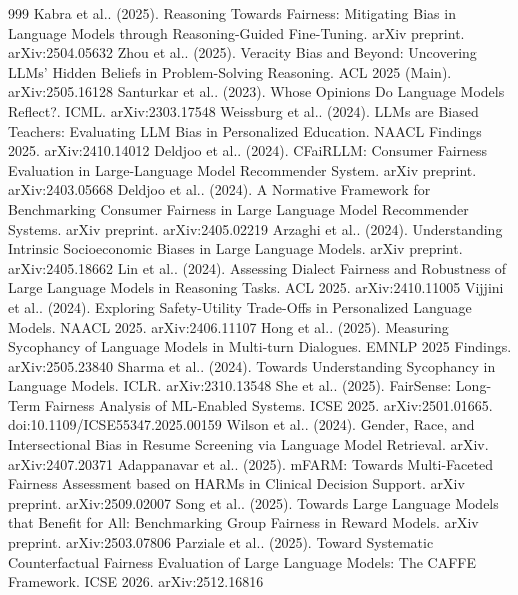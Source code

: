 \documentclass[10pt]{article}
\begin{document}
\begin{thebibliography}{999}
 Kabra et al.. (2025). Reasoning Towards Fairness: Mitigating Bias in Language Models through Reasoning-Guided Fine-Tuning. arXiv preprint. arXiv:2504.05632
 Zhou et al.. (2025). Veracity Bias and Beyond: Uncovering LLMs' Hidden Beliefs in Problem-Solving Reasoning. ACL 2025 (Main). arXiv:2505.16128
 Santurkar et al.. (2023). Whose Opinions Do Language Models Reflect?. ICML. arXiv:2303.17548
 Weissburg et al.. (2024). LLMs are Biased Teachers: Evaluating LLM Bias in Personalized Education. NAACL Findings 2025. arXiv:2410.14012
 Deldjoo et al.. (2024). CFaiRLLM: Consumer Fairness Evaluation in Large-Language Model Recommender System. arXiv preprint. arXiv:2403.05668
 Deldjoo et al.. (2024). A Normative Framework for Benchmarking Consumer Fairness in Large Language Model Recommender Systems. arXiv preprint. arXiv:2405.02219
 Arzaghi et al.. (2024). Understanding Intrinsic Socioeconomic Biases in Large Language Models. arXiv preprint. arXiv:2405.18662
 Lin et al.. (2024). Assessing Dialect Fairness and Robustness of Large Language Models in Reasoning Tasks. ACL 2025. arXiv:2410.11005
 Vijjini et al.. (2024). Exploring Safety-Utility Trade-Offs in Personalized Language Models. NAACL 2025. arXiv:2406.11107
 Hong et al.. (2025). Measuring Sycophancy of Language Models in Multi-turn Dialogues. EMNLP 2025 Findings. arXiv:2505.23840
 Sharma et al.. (2024). Towards Understanding Sycophancy in Language Models. ICLR. arXiv:2310.13548
 She et al.. (2025). FairSense: Long-Term Fairness Analysis of ML-Enabled Systems. ICSE 2025. arXiv:2501.01665. doi:10.1109/ICSE55347.2025.00159
 Wilson et al.. (2024). Gender, Race, and Intersectional Bias in Resume Screening via Language Model Retrieval. arXiv. arXiv:2407.20371
 Adappanavar et al.. (2025). mFARM: Towards Multi-Faceted Fairness Assessment based on HARMs in Clinical Decision Support. arXiv preprint. arXiv:2509.02007
 Song et al.. (2025). Towards Large Language Models that Benefit for All: Benchmarking Group Fairness in Reward Models. arXiv preprint. arXiv:2503.07806
 Parziale et al.. (2025). Toward Systematic Counterfactual Fairness Evaluation of Large Language Models: The CAFFE Framework. ICSE 2026. arXiv:2512.16816

\end{thebibliography}
\end{document}
